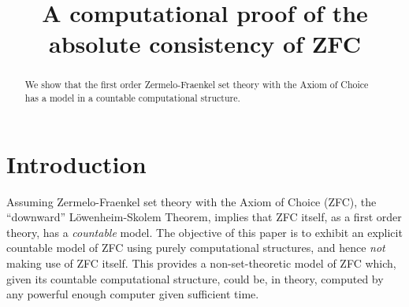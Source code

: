 \documentclass[a4paper,openany]{amsart}
\begin{document}
\sloppy

\title[ZFC is absolutely consistent]{A computational proof of the absolute consistency of ZFC}

%

\begin{abstract}
We show that the first order Zermelo-Fraenkel set theory with the Axiom of
Choice has a model in a countable computational structure.
\end{abstract} 
\maketitle 
\tableofcontents 


\section{Introduction}

Assuming Zermelo-Fraenkel set theory with the Axiom of Choice (ZFC), the
``downward'' L\"owenheim-Skolem Theorem, \cite[Theorem 12.1, page
157]{jech2003setTheory} implies that ZFC itself, as a first order theory, has a
\emph{countable} model. The objective of this paper is to exhibit an explicit
countable model of ZFC using purely computational structures, and hence
\emph{not} making use of ZFC itself. This provides a non-set-theoretic model of
ZFC which, given its countable computational structure, could be, in theory,
computed by any powerful enough computer given sufficient time.

\printbibliography
\end{document}
